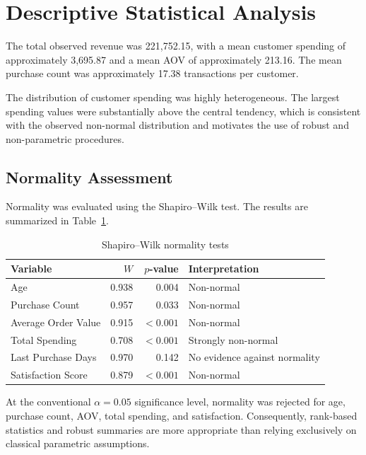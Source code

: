 \documentclass[11pt,a4paper]{article}
\begin{document}
\section{Descriptive Statistical Analysis}

The total observed revenue was 221,752.15, with a mean customer spending
of approximately 3,695.87 and a mean AOV of approximately 213.16.
The mean purchase count was approximately 17.38 transactions per customer.

The distribution of customer spending was highly heterogeneous. The
largest spending values were substantially above the central tendency,
which is consistent with the observed non-normal distribution and
motivates the use of robust and non-parametric procedures.

\subsection{Normality Assessment}

Normality was evaluated using the Shapiro--Wilk test. The results are
summarized in Table~\ref{tab:normality}.

\begin{table}[H]
\centering
\caption{Shapiro--Wilk normality tests}
\label{tab:normality}
\begin{tabular}{lrrl}
\toprule
Variable & $W$ & $p$-value & Interpretation \\
\midrule
Age & 0.938 & 0.004 & Non-normal \\
Purchase Count & 0.957 & 0.033 & Non-normal \\
Average Order Value & 0.915 & $<0.001$ & Non-normal \\
Total Spending & 0.708 & $<0.001$ & Strongly non-normal \\
Last Purchase Days & 0.970 & 0.142 & No evidence against normality \\
Satisfaction Score & 0.879 & $<0.001$ & Non-normal \\
\bottomrule
\end{tabular}
\end{table}

At the conventional $\alpha=0.05$ significance level, normality was
rejected for age, purchase count, AOV, total spending, and satisfaction.
Consequently, rank-based statistics and robust summaries are more
appropriate than relying exclusively on classical parametric assumptions.

\end{document}
